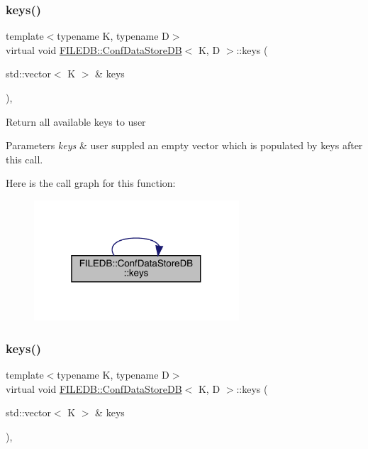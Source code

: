 \subsubsection{\texorpdfstring{keys()}{keys()}\hspace{0.1cm}{\footnotesize\ttfamily [1/3]}}
{\footnotesize\ttfamily template$<$typename K, typename D$>$ \\
virtual void \mbox{\hyperlink{classFILEDB_1_1ConfDataStoreDB}{F\+I\+L\+E\+D\+B\+::\+Conf\+Data\+Store\+DB}}$<$ K, D $>$\+::keys (\begin{DoxyParamCaption}\item[{std\+::vector$<$ K $>$ \&}]{keys }\end{DoxyParamCaption})\hspace{0.3cm}{\ttfamily [inline]}, {\ttfamily [virtual]}}

Return all available keys to user 
\begin{DoxyParams}{Parameters}
{\em keys} & user suppled an empty vector which is populated by keys after this call. \\
\hline
\end{DoxyParams}
Here is the call graph for this function\+:
\nopagebreak
\begin{figure}[H]
\begin{center}
\leavevmode
\includegraphics[width=217pt]{d8/d19/classFILEDB_1_1ConfDataStoreDB_a794e05e3888ab95e0396a196b5a18e65_cgraph}
\end{center}
\end{figure}
\mbox{\label{classFILEDB_1_1ConfDataStoreDB_a794e05e3888ab95e0396a196b5a18e65}} 
\subsubsection{\texorpdfstring{keys()}{keys()}\hspace{0.1cm}{\footnotesize\ttfamily [2/3]}}
{\footnotesize\ttfamily template$<$typename K, typename D$>$ \\
virtual void \mbox{\hyperlink{classFILEDB_1_1ConfDataStoreDB}{F\+I\+L\+E\+D\+B\+::\+Conf\+Data\+Store\+DB}}$<$ K, D $>$\+::keys (\begin{DoxyParamCaption}\item[{std\+::vector$<$ K $>$ \&}]{keys }\end{DoxyParamCaption})\hspace{0.3cm}{\ttfamily [inline]}, {\ttfamily [virtual]}}

